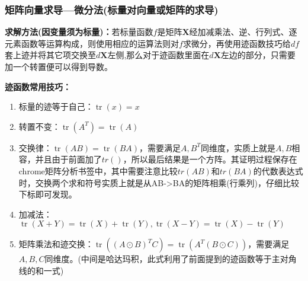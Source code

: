 \documentclass[UTF8]{article}
\begin{document}
    \subsubsection{矩阵向量求导---微分法(标量对向量或矩阵的求导)}
    \textbf{求解方法(因变量须为标量)：}若标量函数$f$是矩阵$\bm{X}$经加减乘法、逆、行列式、逐元素函数等运算构成，则使用相应的运算法则对$f$求微分，再使用迹函数技巧给$df$套上迹并将其它项交换至$d\bm{X}$左侧,那么对于迹函数里面在$d\bm{X}$左边的部分，只需要加一个转置便可以得到导数。


    \textbf{迹函数常用技巧：}
    \begin{enumerate}
        \item 标量的迹等于自己：$\operatorname{tr}(x)=x$
        \item 转置不变：$\operatorname{tr}\left(A^{T}\right)=\operatorname{tr}(A)$
        \item 交换律：$\operatorname{tr}(A B)=\operatorname{tr}(B A)$，需要满足$A,B^T$同维度，实质上就是$A,B$相容，并且由于前面加了$tr()$，所以最后结果是一个方阵。其证明过程保存在chrome矩阵分析书签中，其中需要注意比较$tr(AB)$和$tr(BA)$的代数表达式时，交换两个求和符号实质上就是从AB->BA的矩阵相乘(行乘列)，仔细比较下标即可发现。
        \item 加减法：$\operatorname{tr}(X+Y)=\operatorname{tr}(X)+\operatorname{tr}(Y), \operatorname{tr}(X-Y)=\operatorname{tr}(X)-\operatorname{tr}(Y)$
        \item 矩阵乘法和迹交换：$\operatorname{tr}\left((A \odot B)^{T} C\right)=\operatorname{tr}\left(A^{T}(B \odot C)\right)$，需要满足$A,B,C$同维度。(中间是哈达玛积，此式利用了前面提到的迹函数等于主对角线的和一式)
    \end{enumerate}
\end{document}
